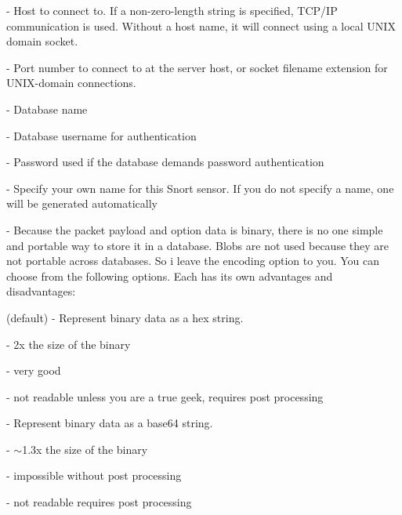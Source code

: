 \documentclass[english]{report}
\begin{document}
\begin{description}{}
\item [\texttt{host}] - Host to connect to. If a non-zero-length string is specified, TCP/IP communication is used. Without a host name, it will connect using a local UNIX domain socket.
\item [\texttt{port}] - Port number to connect to at the server host, or socket filename extension for UNIX-domain connections. 
\item [\texttt{dbname}] - Database name 
\item [\texttt{user}] - Database username for authentication
\item [\texttt{password}] - Password used if the database demands password authentication
\item [\texttt{sensor\_name}] - Specify your own name for this Snort sensor. If you do not specify a name, one will be generated automatically
\item [\texttt{encoding}] - Because the packet payload and option data is binary, there is no one simple and portable way to store it in a database. Blobs are not used because they are not portable across databases. So i leave the encoding option to you. You can choose from the following options. Each has its own advantages and disadvantages:

   \begin{description}{}
       \item [\texttt{hex}](default) - Represent binary data as a hex string. 

       \begin{description}{}
             \item [Storage~requirements]- 2x the size of the binary
             \item [Searchability]- very good 
             \item [Human~readability]- not readable unless you are a true geek, requires post processing
       \end{description}
       \item [\texttt{base64}] - Represent binary data as a base64 string. 

      \begin{description}{}
            \item [Storage~requirements]- $\sim$1.3x the size of the binary 
            \item [Searchability]- impossible without post processing 
            \item [Human~readability]- not readable requires post processing
      \end{description}


\end{description}
\end{description}
\end{document}
